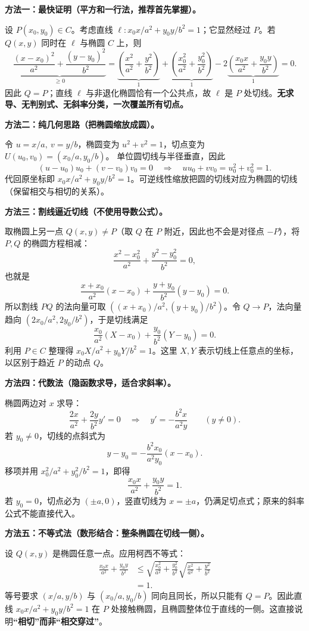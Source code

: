\begin{proofbox}
\textbf{方法一：最快证明（平方和一行法，推荐首先掌握）。}

设 $P(x_0,y_0)\in C$。考虑直线 $\ell:x_0x/a^2+y_0y/b^2=1$；它显然经过 $P$。若 $Q(x,y)$ 同时在 $\ell$ 与椭圆 $C$ 上，则
\[
 \underbrace{\frac{(x-x_0)^2}{a^2}+\frac{(y-y_0)^2}{b^2}}_{\ge0}
 =\underbrace{\left(\frac{x^2}{a^2}+\frac{y^2}{b^2}\right)}_{1}
 +\underbrace{\left(\frac{x_0^2}{a^2}+\frac{y_0^2}{b^2}\right)}_{1}
 -2\underbrace{\left(\frac{x_0x}{a^2}+\frac{y_0y}{b^2}\right)}_{1}=0.
\]
因此 $Q=P$；直线 $\ell$ 与非退化椭圆恰有一个公共点，故 $\ell$ 是 $P$ 处切线。\textbf{无求导、无判别式、无斜率分类，一次覆盖所有切点。}

\medskip
\textbf{方法二：纯几何思路（把椭圆缩放成圆）。}

令 $u=x/a,\ v=y/b$，椭圆变为 $u^2+v^2=1$，切点变为 $U(u_0,v_0)=(x_0/a,y_0/b)$。
单位圆切线与半径垂直，因此
\[
 (u-u_0)u_0+(v-v_0)v_0=0
 \quad\Longrightarrow\quad uu_0+vv_0=u_0^2+v_0^2=1.
\]
代回原坐标即 $x_0x/a^2+y_0y/b^2=1$。可逆线性缩放把圆的切线对应为椭圆的切线（保留相交与相切的关系）。

\medskip
\textbf{方法三：割线逼近切线（不使用导数公式）。}

取椭圆上另一点 $Q(x,y)\ne P$（取 $Q$ 在 $P$ 附近，因此也不会是对径点 $-P$），将 $P,Q$ 的椭圆方程相减：
\[
 \frac{x^2-x_0^2}{a^2}+\frac{y^2-y_0^2}{b^2}=0,
\]
也就是
\[
 \frac{x+x_0}{a^2}(x-x_0)+\frac{y+y_0}{b^2}(y-y_0)=0.
\]
所以割线 $PQ$ 的法向量可取 $((x+x_0)/a^2,(y+y_0)/b^2)$。令 $Q\to P$，法向量趋向 $(2x_0/a^2,2y_0/b^2)$，于是切线满足
\[
 \frac{x_0}{a^2}(X-x_0)+\frac{y_0}{b^2}(Y-y_0)=0.
\]
利用 $P\in C$ 整理得 $x_0X/a^2+y_0Y/b^2=1$。这里 $X,Y$ 表示切线上任意点的坐标，以区别于趋近 $P$ 的动点 $Q$。

\medskip
\textbf{方法四：代数法（隐函数求导，适合求斜率）。}

椭圆两边对 $x$ 求导：
\[
 \frac{2x}{a^2}+\frac{2y}{b^2}y'=0
 \quad\Longrightarrow\quad
 y'=-\frac{b^2x}{a^2y}\qquad(y\ne0).
\]
若 $y_0\ne0$，切线的点斜式为
\[
 y-y_0=-\frac{b^2x_0}{a^2y_0}(x-x_0).
\]
移项并用 $x_0^2/a^2+y_0^2/b^2=1$，即得
\[
 \frac{x_0x}{a^2}+\frac{y_0y}{b^2}=1.
\]
若 $y_0=0$，切点必为 $(\pm a,0)$，竖直切线为 $x=\pm a$，仍满足切点式；原来的斜率公式不能直接代入。

\medskip
\textbf{方法五：不等式法（数形结合：整条椭圆在切线一侧）。}

设 $Q(x,y)$ 是椭圆任意一点。应用柯西不等式：
\[
 \begin{aligned}
 \frac{x_0x}{a^2}+\frac{y_0y}{b^2}
 &\le \sqrt{\frac{x_0^2}{a^2}+\frac{y_0^2}{b^2}}
       \sqrt{\frac{x^2}{a^2}+\frac{y^2}{b^2}}\\
 &=1.
 \end{aligned}
\]
等号要求 $(x/a,y/b)$ 与 $(x_0/a,y_0/b)$ 同向且同长，所以只能有 $Q=P$。因此直线 $x_0x/a^2+y_0y/b^2=1$ 在 $P$ 处接触椭圆，且椭圆整体位于直线的一侧。这直接说明\textbf{“相切”而非“相交穿过”}。


\end{proofbox}
